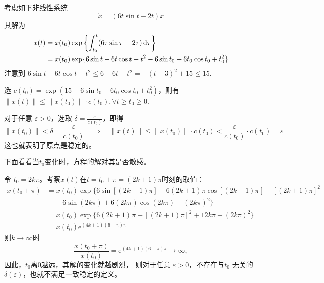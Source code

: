 \begin{example}[稳定但不一致稳定]
  考虑如下非线性系统
  \[ \dot{x} = (6 t  \sin  t - 2 t) x \]
  其解为
  \begin{align*}
    x (t) & =  x (t_0) \exp \left\{ \int^t_{t_0} (6 \tau \sin \tau - 2 \tau)
    \mathop{}\!\mathrm{d} \tau \right\}\\
    & =  x (t_0) \exp \{ 6 \sin  t - 6 t  \cos  t - t^2 - 6 \sin  t_0 + 6
    t_0 \cos  t_0 + t^2_0 \}
  \end{align*}
  注意到 $6 \sin  t - 6 t  \cos  t - t^2 \leq 6 + 6 t - t^2 = - (t - 3)^2 + 15
  \leq 15$.
  
  选 $c (t_0) = \exp (15 - 6 \sin  t_0 + 6 t_0 \cos  t_0 + t^2_0)$，则有 $\| x (t) \| \leq \| x (t_0) \| \cdot c (t_0), \forall t
  \geq t_0 \geq 0$.
  
  对于任意 $\varepsilon > 0$，选取 $\delta = \frac{\varepsilon}{c (t_0)}$，即得
  \[ \| x (t_0) \| < \delta = \frac{\varepsilon}{c (t_0)} \quad \Rightarrow
     \quad \| x (t) \| \leq \| x (t_0) \| \cdot c (t_0) < \frac{\varepsilon}{c
     (t_0)} \cdot c (t_0) = \varepsilon \]
  这也就表明了原点是稳定的。
  
  下面看看当$t_0$变化时，方程的解对其是否敏感。

  令 $t_0 = 2 k \pi$。考察$x (t)$在$t = t_0 + \pi = (2 k + 1)\pi$时刻的取值：
  \begin{align*}
    x (t_0 + \pi) & =  x (t_0) \exp \{ 6 \sin [(2 k + 1) \pi] - 6 (2 k + 1)
    \pi \cos [(2 k + 1) \pi] - [(2 k + 1) \pi]^2 \\
    &  \quad - 6 \sin (2 k \pi) + 6 (2 k \pi) \cos (2 k \pi) - (2 k \pi)^2 \} \\
    & =  x (t_0) \exp \{ 6 (2 k + 1) \pi - [(2 k + 1) \pi]^2  + 12 k \pi -
    (2 k \pi)^2 \} \\
    & =  x (t_0) \mathrm{e}^{\left( \text{} 4 k + 1 \right) (6 - \pi) \pi}
  \end{align*}
  则$k \rightarrow\infty$时
  \[ \frac{x (t_0 + \pi)}{x (t_0)} = \mathrm{e}^{\left( \text{} 4 k + 1 \right) (6 -
     \pi) \pi} \rightarrow \infty,  \]
  因此，$t_0$离$0$越远，其解的变化就越剧烈，
  则对于任意 $\varepsilon > 0$，不存在与$t_0$ 无关的$\delta (\varepsilon)$，也就不满足一致稳定的定义。
\end{example}